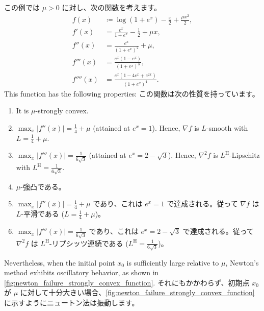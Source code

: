 \documentclass[0_main]{subfiles}
\begin{document}
    この例では $\mu>0$ に対し、次の関数を考えます。
\fi
\begin{align*}
    f(x)     & \coloneqq \log(1 + e^x) - \frac{x}{2} + \frac{\mu x^2}{2}, \\
    f'(x)    & = \frac{e^x}{1+e^x} - \frac{1}{2} + \mu x,                 \\
    f''(x)   & = \frac{e^x}{(1+e^x)^2} + \mu,                             \\
    f'''(x)  & = \frac{e^x(1 - e^x)}{(1+e^x)^3},                          \\
    f''''(x) & = \frac{e^x(1 - 4e^x + e^{2x})}{(1+e^x)^4}.
\end{align*}
\ifEn
    This function has the following properties:
\else
    この関数は次の性質を持っています。
\fi
\begin{enumerate}[nosep,label=\textbullet]
    \ifEn
    \item It is $\mu$-strongly convex.
    \item $\max_x \lvert f''(x) \rvert = \frac{1}{4} + \mu$ (attained at $e^x=1$). Hence, $\nabla f$ is $L$-smooth with $L=\frac{1}{4}+\mu$.
    \item $\max_x \lvert f'''(x) \rvert = \frac{1}{6\sqrt{3}}$ (attained at $e^x=2-\sqrt{3}$). Hence, $\nabla^2 f$ is $L^\mathrm{H}$-Lipschitz with $L^{\mathrm{H}}=\frac{1}{6\sqrt{3}}$.
          \else
    \item $\mu$-強凸である。
    \item $\max_x \lvert f''(x) \rvert = \frac{1}{4} + \mu$ であり、これは $e^x=1$ で達成される。従って $\nabla f$ は $L$-平滑である ($L=\frac{1}{4}+\mu$)。
    \item $\max_x \lvert f'''(x) \rvert = \frac{1}{6\sqrt{3}}$ であり、これは $e^x=2-\sqrt{3}$ で達成される。従って $\nabla^2 f$ は $L^\mathrm{H}$-リプシッツ連続である ($L^\mathrm{H}=\frac{1}{6\sqrt{3}}$)。
          \fi
\end{enumerate}
\ifEn
    Nevertheless, when the initial point $x_0$ is sufficiently large relative to $\mu$, Newton's method exhibits oscillatory behavior, as shown in \cref{fig:newton_failure_strongly_convex_function}.
\else
    それにもかかわらず、初期点 $x_0$ が $\mu$ に対して十分大きい場合、\cref{fig:newton_failure_strongly_convex_function} に示すようにニュートン法は振動します。
\fi
\end{document}
